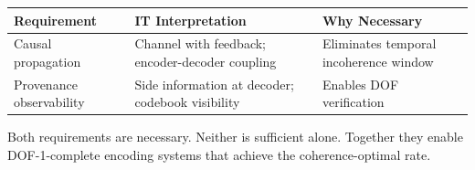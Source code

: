 \begin{center}
\begin{tabularx}{\linewidth}{lYY}
\toprule
\textbf{Requirement} & \textbf{IT Interpretation} & \textbf{Why Necessary} \\
\midrule
Causal propagation & Channel with feedback; encoder-decoder coupling & Eliminates temporal incoherence window \\
Provenance observability & Side information at decoder; codebook visibility & Enables DOF verification \\
\bottomrule
\end{tabularx}
\end{center}

Both requirements are necessary. Neither is sufficient alone. Together they enable DOF-1-complete encoding systems that achieve the coherence-optimal rate.

